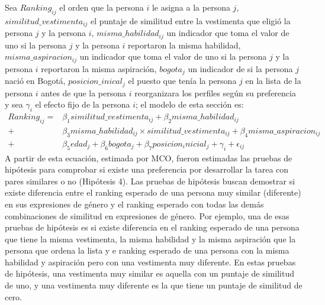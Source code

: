 Sea $Ranking_{ij}$ el orden que la persona $i$ le asigna a la persona $j$, $similitud\_vestimenta_{ij}$ el puntaje de similitud entre la vestimenta que eligió la persona $j$ y la persona $i$, $misma\_habilidad_{ij}$ un indicador que toma el valor de uno si la persona $j$ y la persona $i$ reportaron la misma habilidad, $misma\_aspiracion_{ij}$ un indicador que toma el valor de uno si la persona $j$ y la persona $i$ reportaron la misma aspiración, $bogota_j$ un indicador de si la persona $j$ nació en Bogotá, $posicion\_inical_j$ el puesto que tenía la persona $j$ en la lista de la persona $i$ antes de que la persona $i$ reorganizara los perfiles según su preferencia y sea $\gamma_i$ el efecto fijo de la persona $i$; el modelo de esta sección es:
\small{
\begin{equation}
    \begin{split}
	Ranking_{ij}=& \beta_1similitud\_vestimenta_{ij} + \beta_2misma\_habilidad_{ij} \\
	            +& \beta_3misma\_habilidad_{ij}\times similitud\_vestimenta_{ij} + \beta_4misma\_aspiracion_{ij} \\
	            +& \beta_5edad_j +\beta_6bogota_j + \beta_7posicion_inicial_j + \gamma_i + \epsilon_{ij}
    \end{split}
\end{equation}}
A partir de esta ecuación, estimada por MCO, fueron estimadas las pruebas de hipótesis para comprobar si existe una preferencia por desarrollar la tarea con pares similares o no (Hipótesis 4). Las pruebas de hipótesis buscan demostrar si existe diferencia entre el ranking esperado de una persona muy similar (diferente) en sus expresiones de género y el ranking esperado con todas las demás combinaciones de similitud en expresiones de género. Por ejemplo, una de esas pruebas de hipótesis es si existe diferencia en el ranking esperado de una persona que tiene la misma vestimenta, la misma habilidad y la misma aspiración que la persona que ordena la lista y e ranking esperado de una persona con la misma habilidad y aspiración pero con una vestimenta muy diferente. En estas pruebas de hipótesis, una vestimenta muy similar es aquella con un puntaje de similitud de uno, y una vestimenta muy diferente es la que tiene un puntaje de similitud de cero. 

